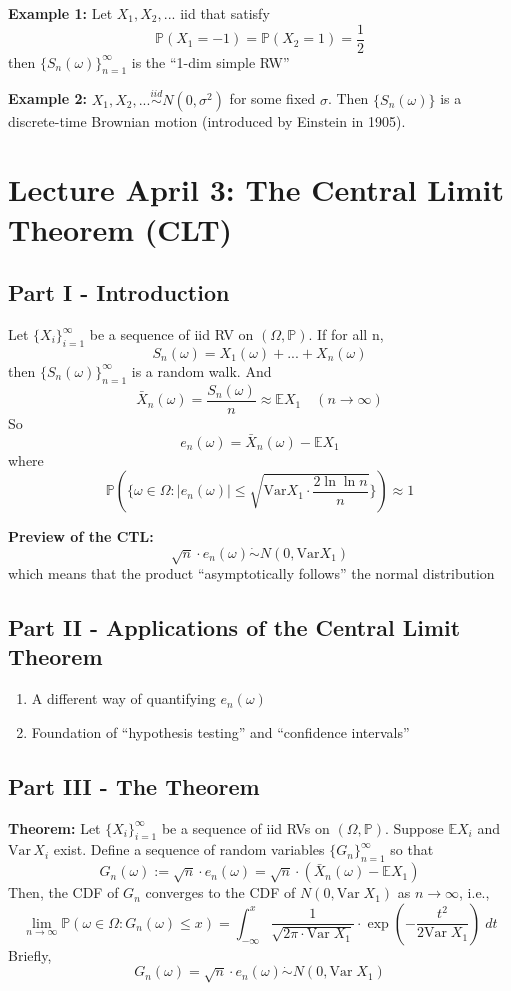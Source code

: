 \documentclass[12pt]{article}
\renewcommand{\P}{\mathbb{P}}
\newcommand{\E}{\mathbb{E}}
\newcommand{\Var}{\text{Var}\;}
\begin{document}
\textbf{Example 1:} Let $X_1, X_2, ...$ iid that satisfy 
\[\P(X_1 = -1) = \P(X_2 = 1) = \frac{1}{2}\]
then $\{S_n(\omega)\}_{n=1}^\infty$ is the ``1-dim simple RW''

\textbf{Example 2:} $X_1, X_2, ... \overset{iid}{\sim} N(0, \sigma^2)$ for some fixed $\sigma$. Then $\{S_n(\omega)\}$ is a discrete-time Brownian motion (introduced by Einstein in 1905).

\section*{Lecture April 3: The Central Limit Theorem (CLT)}
\subsection*{Part I - Introduction}
Let $\{X_i\}_{i=1}^\infty$ be a sequence of iid RV on $(\Omega, \P)$. If for all n,
\[S_n(\omega) = X_1(\omega) + ... + X_n(\omega)\]
then $\{S_n(\omega)\}_{n=1}^\infty$ is a random walk. And 
\[\bar{X}_n(\omega) = \frac{S_n(\omega)}{n} \approx \E X_1 \quad (n \to \infty)\]
So 
\[e_n(\omega) = \bar{X}_n(\omega) - \E X_1\]
where
\[\P(\{\omega \in \Omega: |e_n(\omega)| \leq \sqrt{\text{Var} X_1 \cdot \frac{2\ln \ln n}{n}}\}) \approx 1\]

\textbf{Preview of the CTL:}
\[\sqrt{n} \cdot e_n(\omega) \dot \sim N(0, \text{Var} X_1)\]
which means that the product ``asymptotically follows'' the normal distribution 

\subsection*{Part II - Applications of the Central Limit Theorem}
\begin{enumerate}
    \item A different way of quantifying $e_n(\omega)$
    \item Foundation of ``hypothesis testing'' and ``confidence intervals''
\end{enumerate}

\subsection*{Part III - The Theorem}
\textbf{Theorem:} Let $\{X_i\}_{i=1}^\infty$ be a sequence of iid RVs on $(\Omega, \P)$. Suppose $\E X_i$ and $\text{Var}\, X_i$ exist. Define a sequence of random variables $\{G_n\}_{n=1}^\infty$ so that 
\[G_n(\omega) :=\sqrt{n} \cdot e_n(\omega) = \sqrt{n} \cdot (\bar{X}_n(\omega) - \E X_1)\]
Then, the CDF of $G_n$ converges to the CDF of $N(0, \Var X_1)$ as $n \to \infty$, i.e.,
\[\lim_{n\to \infty}\P(\omega \in \Omega:G_n(\omega) \leq x) = \int_{-\infty}^x \frac{1}{\sqrt{2\pi \cdot \Var X_1}} \cdot \exp\left(-\frac{t^2}{2\Var X_1}\right)\; dt\]
Briefly, 
\[G_n(\omega) =\sqrt{n} \cdot e_n(\omega) \dot \sim N(0, \Var X_1)\]
\end{document}
